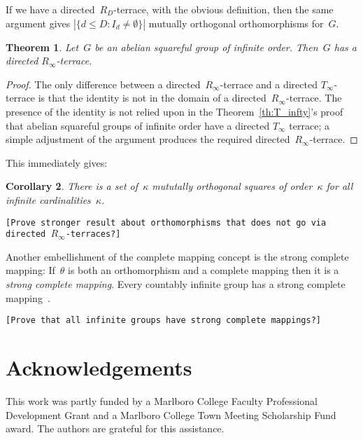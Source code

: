 \documentclass[12pt,a4paper]{article}
\newtheorem{thm}{Theorem}[section]
\newtheorem{cor}[thm]{Corollary}
\begin{document}
If we have a directed~$R_D$-terrace, with the obvious definition, then the same argument gives $ | \{ d \leq D : I_d \neq \emptyset \} |$ mutually orthogonal orthomorphisms for~$G$.

\begin{thm}\label{th:R_infty}
Let~$G$ be an abelian squareful group of infinite order.   Then~$G$ has a directed $R_{\infty}$-terrace.
\end{thm}

\begin{proof}
The only difference between a directed~$R_{\infty}$-terrace and a directed $T_{\infty}$-terrace is that the identity is not in the domain of a directed~$R_{\infty}$-terrace.  The presence of the identity is not relied upon in the Theorem~\ref{th:T_infty}'s proof that abelian squareful groups of infinite order have a  directed $T_{\infty}$ terrace; a simple adjustment of the argument produces the required directed~$R_{\infty}$-terrace.
\end{proof}

This immediately gives:

\begin{cor}
There is a set of~$\kappa$ mututally orthogonal squares of order~$\kappa$ for all infinite cardinalities~$\kappa$.
\end{cor}


\texttt{[Prove stronger result about orthomorphisms that does not go via directed $R_{\infty}$-terraces?]}





Another embellishment of the complete mapping concept is the strong complete mapping:
If~$\theta$ is both an orthomorphism and a complete mapping then it is a {\em strong complete mapping}.  Every countably infinite group has a strong complete mapping~\cite{Evans12}.

\texttt{[Prove that all infinite groups have strong complete mappings?]}





\section*{Acknowledgements}

This work was partly funded by a Marlboro College Faculty Professional Development Grant and a Marlboro College Town Meeting Scholarship Fund award.  The authors are grateful for this assistance.
\end{document}
